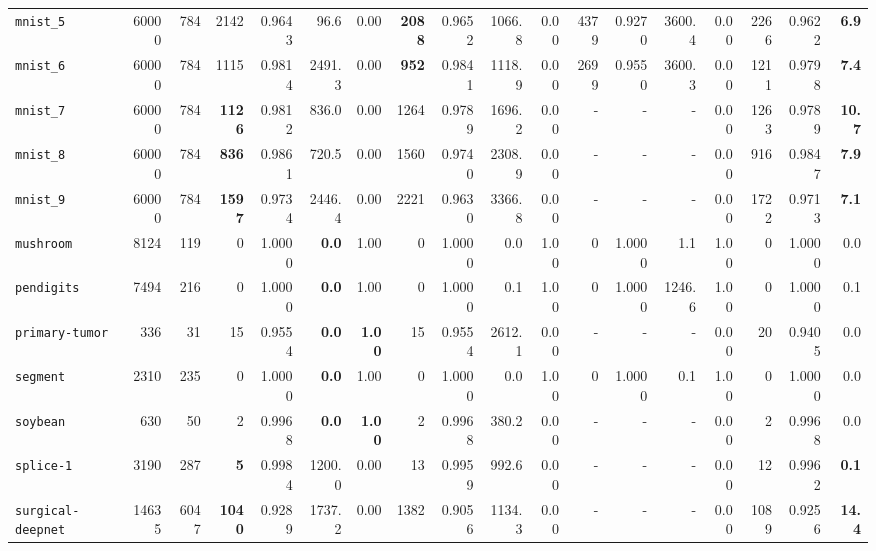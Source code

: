 \begin{tabular}{lccrrrrrrrrrrrrrrr}
\texttt{mnist\_5} & \multicolumn{1}{r}{60000} & \multicolumn{1}{r}{784}  & 2142 & 0.9643 & 96.6 & 0.00 & \textbf{2088} & 0.9652 & 1066.8 & 0.00 & 4379 & 0.9270 & 3600.4 & 0.00 & 2266 & 0.9622 & \textbf{6.9}\\
\texttt{mnist\_6} & \multicolumn{1}{r}{60000} & \multicolumn{1}{r}{784}  & 1115 & 0.9814 & 2491.3 & 0.00 & \textbf{952} & 0.9841 & 1118.9 & 0.00 & 2699 & 0.9550 & 3600.3 & 0.00 & 1211 & 0.9798 & \textbf{7.4}\\
\texttt{mnist\_7} & \multicolumn{1}{r}{60000} & \multicolumn{1}{r}{784}  & \textbf{1126} & 0.9812 & 836.0 & 0.00 & 1264 & 0.9789 & 1696.2 & 0.00 & - & - & - & 0.00 & 1263 & 0.9789 & \textbf{10.7}\\
\texttt{mnist\_8} & \multicolumn{1}{r}{60000} & \multicolumn{1}{r}{784}  & \textbf{836} & 0.9861 & 720.5 & 0.00 & 1560 & 0.9740 & 2308.9 & 0.00 & - & - & - & 0.00 & 916 & 0.9847 & \textbf{7.9}\\
\texttt{mnist\_9} & \multicolumn{1}{r}{60000} & \multicolumn{1}{r}{784}  & \textbf{1597} & 0.9734 & 2446.4 & 0.00 & 2221 & 0.9630 & 3366.8 & 0.00 & - & - & - & 0.00 & 1722 & 0.9713 & \textbf{7.1}\\
\texttt{mushroom} & \multicolumn{1}{r}{8124} & \multicolumn{1}{r}{119}  & 0 & 1.0000 & \textbf{0.0} & 1.00 & 0 & 1.0000 & 0.0 & 1.00 & 0 & 1.0000 & 1.1 & 1.00 & 0 & 1.0000 & 0.0\\
\texttt{pendigits} & \multicolumn{1}{r}{7494} & \multicolumn{1}{r}{216}  & 0 & 1.0000 & \textbf{0.0} & 1.00 & 0 & 1.0000 & 0.1 & 1.00 & 0 & 1.0000 & 1246.6 & 1.00 & 0 & 1.0000 & 0.1\\
\texttt{primary-tumor} & \multicolumn{1}{r}{336} & \multicolumn{1}{r}{31}  & 15 & 0.9554 & \textbf{0.0} & \textbf{1.00} & 15 & 0.9554 & 2612.1 & 0.00 & - & - & - & 0.00 & 20 & 0.9405 & 0.0\\
\texttt{segment} & \multicolumn{1}{r}{2310} & \multicolumn{1}{r}{235}  & 0 & 1.0000 & \textbf{0.0} & 1.00 & 0 & 1.0000 & 0.0 & 1.00 & 0 & 1.0000 & 0.1 & 1.00 & 0 & 1.0000 & 0.0\\
\texttt{soybean} & \multicolumn{1}{r}{630} & \multicolumn{1}{r}{50}  & 2 & 0.9968 & \textbf{0.0} & \textbf{1.00} & 2 & 0.9968 & 380.2 & 0.00 & - & - & - & 0.00 & 2 & 0.9968 & 0.0\\
\texttt{splice-1} & \multicolumn{1}{r}{3190} & \multicolumn{1}{r}{287}  & \textbf{5} & 0.9984 & 1200.0 & 0.00 & 13 & 0.9959 & 992.6 & 0.00 & - & - & - & 0.00 & 12 & 0.9962 & \textbf{0.1}\\
\texttt{surgical-deepnet} & \multicolumn{1}{r}{14635} & \multicolumn{1}{r}{6047}  & \textbf{1040} & 0.9289 & 1737.2 & 0.00 & 1382 & 0.9056 & 1134.3 & 0.00 & - & - & - & 0.00 & 1089 & 0.9256 & \textbf{14.4}\\

\end{tabular}
